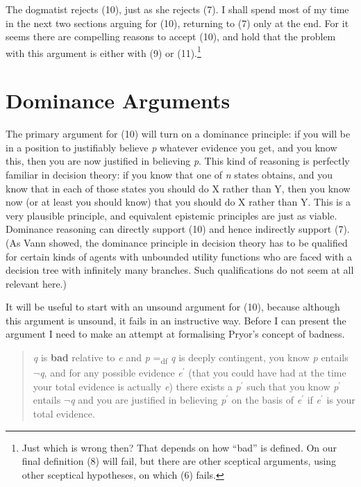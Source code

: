 \noindent The dogmatist rejects (10), just as she rejects (7). I shall spend most of my time in the next two sections arguing for (10), returning to (7) only at the end. For it seems there are compelling reasons to accept (10), and hold that the problem with this argument is either with (9) or (11).\footnote{Just which is wrong then? That depends on how ``bad'' is defined. On our final definition (8) will fail, but there are other sceptical arguments, using other sceptical hypotheses, on which (6) fails.} 

\section{Dominance Arguments}

The primary argument for (10) will turn on a dominance principle: if you will be in a position to justifiably believe \textit{p} whatever evidence you get, and you know this, then you are now justified in believing \textit{p}. This kind of reasoning is perfectly familiar in decision theory: if you know that one of \textit{n} states obtains, and you know that in each of those states you should do X rather than Y, then you know now (or at least you should know) that you should do X rather than Y. This is a very plausible principle, and equivalent epistemic principles are just as viable. Dominance reasoning can directly support (10) and hence indirectly support (7). (As Vann \citet{McGee1999} showed, the dominance principle in decision theory has to be qualified for certain kinds of agents with unbounded utility functions who are faced with a decision tree with infinitely many branches. Such qualifications do not seem at all relevant here.) 

It will be useful to start with an unsound argument for (10), because although this argument is unsound, it fails in an instructive way. Before I can present the argument I need to make an attempt at formalising Pryor's concept of badness.

\begin{quote}
\textit{q} is \textbf{bad} relative to \textit{e} and \textit{p} =\textsubscript{df} \textit{q} is deeply contingent, you know \textit{p} entails \(\neg\)\textit{q}, and for any possible evidence \textit{e}\(^\prime\) (that you could have had at the time your total evidence is actually \textit{e}) there exists a \textit{p}\(^\prime\) such that you know \textit{p}\(^\prime\) entails \(\neg\)\textit{q} and you are justified in believing \textit{p}\(^\prime\) on the basis of \textit{e}\(^\prime\) if \textit{e}\(^\prime\) is your total evidence. 
\end{quote}


